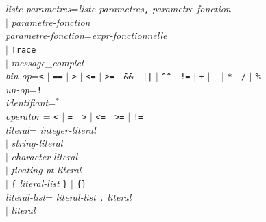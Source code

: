\begin{tabbing}
\emph{liste-parametres}\>\twocol=\>\emph{liste-parametres}\texttt{,}
    \emph{parametre-fonction}\\
    \>$\mid$\> \emph{parametre-fonction}\\

\emph{parametre-fonction}\>\twocol=\>\emph{expr-fonctionnelle} \\
    \>$\mid$\> \texttt{Trace}\\
    \>$\mid$\> \emph{message\_complet}\\


\emph{bin-op}\>\twocol=\>\verb+<+ $\mid$ \verb+==+ $\mid$ \verb+>+
$\mid$ \verb+<=+ $\mid$ \verb+>=+ $\mid$ \verb+&&+ $\mid$ \verb+||+
$\mid$ \verb+^^+ $\mid$  \verb+!=+ $\mid$ \verb:+: $\mid$  \verb:-: $\mid$  \verb:*: $\mid$
    \verb:/: $\mid$  \verb:%: \\

\emph{un-op}\>\twocol=\>\texttt{!}\\

\emph{identifiant}\>\twocol=$^*$ \\

\emph{operator}  \>\twocol=\>  \verb+<+ $\mid$ \verb+=+ $\mid$ \verb+>+ $\mid$ \verb+<=+ $\mid$ \verb+>=+ $\mid$ \verb+!=+ \\ %



\emph{literal}\>\twocol=\>  \emph{integer-literal} \\
    \>$\mid$\> \emph{string-literal}  \\
    \>$\mid$\> \emph{character-literal} \\ 
    \>$\mid$\> \emph{floating-pt-literal} \\ 
    \>$\mid$\> \verb+{+ \emph{literal-list} \verb+}+ $\mid$ \verb:{}:\\

\emph{literal-list}\>\twocol=\> \emph{literal-list} \texttt{,} \emph{literal}\\ 
    \>$\mid$\> \emph{literal}\\


\end{tabbing}
